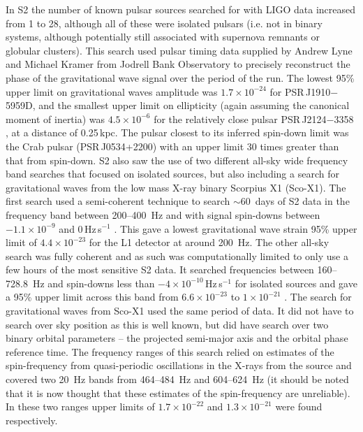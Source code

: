 \documentclass{article}
\begin{document}
In S2 the number of known pulsar sources searched for with LIGO data increased
from 1 to 28, although all of these were isolated pulsars (i.e. not in binary
systems, although potentially still associated with supernova remnants or
globular clusters). This search used pulsar timing data supplied by Andrew Lyne
and Michael Kramer from Jodrell Bank Observatory to precisely reconstruct the
phase of the gravitational wave signal over the period of the run. The lowest
95\% upper limit on gravitational waves amplitude was $1.7\times10^{-24}$ for
PSR\,J1910$-$5959D, and the smallest upper limit on ellipticity (again assuming
the canonical moment of inertia) was $4.5\times10^{-6}$ for the relatively close
pulsar PSR\,J2124$-$3358 \cite{Abbott:2005f}, at a distance of 0.25\,kpc. The
pulsar closest to its inferred spin-down limit was the Crab pulsar
(PSR\,J0534+2200) with an upper limit 30 times greater than that from spin-down.
S2 also saw the use of two different all-sky wide frequency band searches that
focused on isolated sources, but also including a search for gravitational waves
from the low mass X-ray binary Scorpius X1 (Sco-X1). The first search used a
semi-coherent technique to search $\sim60$~days of S2 data in the frequency band
between 200--400~Hz and with signal spin-downs between
$-1.1\times10^{-9}$ and 0\,Hz\,s$^{-1}$ \cite{Abbott:2005g}. This gave a lowest
gravitational wave strain 95\% upper limit of $4.4\times10^{-23}$ for the L1
detector at around 200~Hz. The other all-sky search was fully coherent and as
such was computationally limited to only use a few hours of the most sensitive
S2 data. It searched frequencies between 160--728.8~Hz and spin-downs less than
$-4\times10^{-10}$\,Hz\,s$^{-1}$ for isolated sources and gave a 95\% upper
limit across this band from $6.6\times10^{-23}$ to $1\times10^{-21}$
\cite{Abbott:2007a}. The search for gravitational waves from Sco-X1 used the
same period of data. It did not have to search over sky position as this is well
known, but did have search over two binary orbital parameters -- the projected
semi-major axis and the orbital phase reference time. The frequency ranges of
this search relied on estimates of the spin-frequency from quasi-periodic
oscillations in the X-rays from the source and covered two 20~Hz bands from
464--484~Hz and 604--624~Hz (it should be noted that it is now thought that
these estimates of the spin-frequency are unreliable). In
these two ranges upper limits of $1.7\times10^{-22}$ and $1.3\times10^{-21}$
were found respectively.
\end{document}
